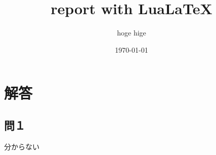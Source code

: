 \documentclass[a4paper, 12pt]{ltjsarticle}
\begin{document}

\title{
  report with {Lua\LaTeX}
}
\author{
  hoge hige
}
\date{\today}

\maketitle %

\tableofcontents %
\newpage

\section{解答}
\subsection*{問１}
分からない
\end{document}
